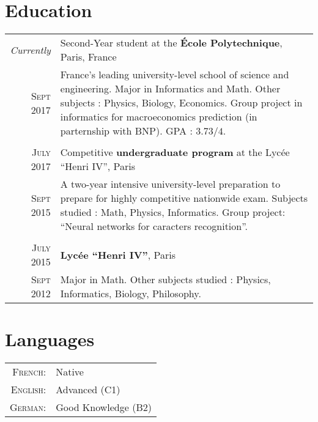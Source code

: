 \documentclass[a4paper,10pt]{article} %
\begin{document}

\section{Education}

\begin{tabular}{r|p{11cm}}
\emph{Currently} & Second-Year student at the \textbf{École Polytechnique}, Paris, France \\
\textsc{Sept} 2017 & \small{France’s leading university-level school of science and engineering.
Major in Informatics and Math. Other subjects : Physics, Biology, Economics.
Group project in informatics for macroeconomics prediction (in parternship with BNP).
GPA : $3.73/4$.}
\\ & \\

\textsc{July 2017} & Competitive \textbf{undergraduate program} at the Lycée ``Henri IV'', Paris\\
\textsc{Sept 2015} & \small{A two-year intensive university-level preparation
to prepare for highly competitive nationwide exam.
Subjects studied : Math, Physics, Informatics. Group project: ``Neural networks for caracters recognition''.}
\\&\\

\textsc{July 2015} & \textbf{Lycée ``Henri IV''}, Paris\\
\textsc{Sept 2012} & \small{Major in Math. Other subjects studied : Physics, Informatics, Biology, Philosophy.}
\end{tabular}


\section{Languages}

\begin{tabular}{rl}
  \textsc{French:} & Native \\
  \textsc{English:} & Advanced (C1)\\
  \textsc{German:} & Good Knowledge (B2)\\
\end{tabular}
\end{document}
